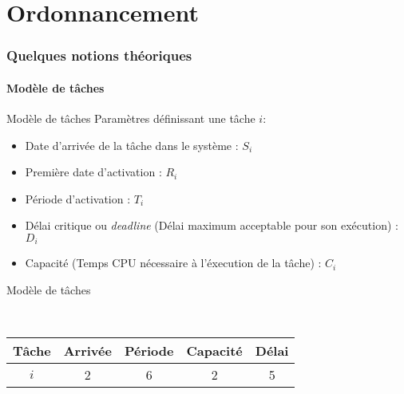 %                                                    
%
%

\part{Ordonnancement}

\section{Quelques notions théoriques}

\subsection{Modèle de tâches}

\begin{frame}{Modèle de tâches}
  Paramètres définissant une tâche $i$:
  \begin{itemize}
    \item Date d'arrivée de la tâche dans le système : $S_i$
    \item Première date d'activation : $R_i$
    \item Période d'activation : $T_i$
    \item Délai critique  ou \emph{deadline} (Délai maximum acceptable
      pour son exécution) : $D_i$
    \item Capacité (Temps CPU nécessaire à l'éxecution de la tâche) :
      $C_i$
  \end{itemize}
\end{frame}

\begin{frame}{Modèle de tâches}
  \begin{center}
    \\
    \begin{tabular}{ccccc}
      \hline
      Tâche & Arrivée & Période & Capacité & Délai \\
      \hline
      $i$ & 2 & 6 & 2 & 5\\
      \hline
    \end{tabular}
  \end{center}
\end{frame}

